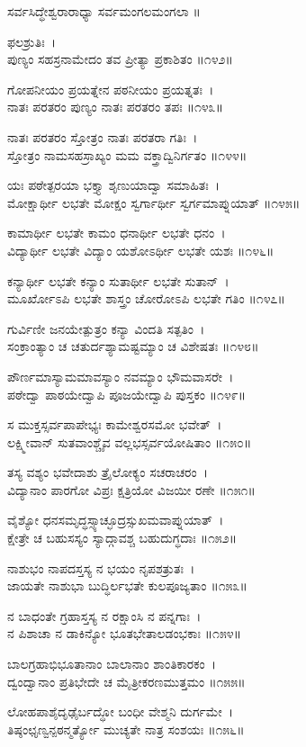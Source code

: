 ಸರ್ವಸಿದ್ಧೇಶ್ವರಾರಾಧ್ಯಾ ಸರ್ವಮಂಗಲಮಂಗಲಾ ॥

ಫಲಶ್ರುತಿಃ~।\\
ಪುಣ್ಯಂ ಸಹಸ್ರನಾಮೇದಂ ತವ ಪ್ರೀತ್ಯಾ ಪ್ರಕಾಶಿತಂ ॥೧೪೨॥

ಗೋಪನೀಯಂ ಪ್ರಯತ್ನೇನ ಪಠನೀಯಂ ಪ್ರಯತ್ನತಃ~।\\
ನಾತಃ ಪರತರಂ ಪುಣ್ಯಂ ನಾತಃ ಪರತರಂ ತಪಃ ॥೧೪೩॥

ನಾತಃ ಪರತರಂ ಸ್ತೋತ್ರಂ ನಾತಃ ಪರತರಾ ಗತಿಃ~।\\
ಸ್ತೋತ್ರಂ ನಾಮಸಹಸ್ರಾಖ್ಯಂ ಮಮ ವಕ್ತ್ರಾದ್ವಿನಿರ್ಗತಂ ॥೧೪೪॥

ಯಃ ಪಠೇತ್ಪರಯಾ ಭಕ್ತ್ಯಾ ಶೃಣುಯಾದ್ವಾ ಸಮಾಹಿತಃ~।\\
ಮೋಕ್ಷಾರ್ಥೀ ಲಭತೇ ಮೋಕ್ಷಂ ಸ್ವರ್ಗಾರ್ಥೀ ಸ್ವರ್ಗಮಾಪ್ನುಯಾತ್ ॥೧೪೫॥

ಕಾಮಾರ್ಥೀ ಲಭತೇ ಕಾಮಂ ಧನಾರ್ಥೀ ಲಭತೇ ಧನಂ~।\\
ವಿದ್ಯಾರ್ಥೀ ಲಭತೇ ವಿದ್ಯಾಂ ಯಶೋಽರ್ಥೀ ಲಭತೇ ಯಶಃ ॥೧೪೬॥

ಕನ್ಯಾರ್ಥೀ ಲಭತೇ ಕನ್ಯಾಂ ಸುತಾರ್ಥೀ ಲಭತೇ ಸುತಾನ್~।\\
ಮೂರ್ಖೋಽಪಿ ಲಭತೇ ಶಾಸ್ತ್ರಂ ಚೋರೋಽಪಿ ಲಭತೇ ಗತಿಂ ॥೧೪೭॥

ಗುರ್ವಿಣೀ ಜನಯೇತ್ಪುತ್ರಂ ಕನ್ಯಾ ವಿಂದತಿ ಸತ್ಪತಿಂ~।\\
ಸಂಕ್ರಾಂತ್ಯಾಂ ಚ ಚತುರ್ದಶ್ಯಾಮಷ್ಟಮ್ಯಾಂ ಚ ವಿಶೇಷತಃ ॥೧೪೮॥

ಪೌರ್ಣಮಾಸ್ಯಾಮಮಾವಸ್ಯಾಂ ನವಮ್ಯಾಂ ಭೌಮವಾಸರೇ~।\\
ಪಠೇದ್ವಾ ಪಾಠಯೇದ್ವಾಪಿ ಪೂಜಯೇದ್ವಾಪಿ ಪುಸ್ತಕಂ ॥೧೪೯॥

ಸ ಮುಕ್ತಸ್ಸರ್ವಪಾಪೇಭ್ಯಃ ಕಾಮೇಶ್ವರಸಮೋ ಭವೇತ್~।\\
ಲಕ್ಷ್ಮೀವಾನ್ ಸುತವಾಂಶ್ಚೈವ ವಲ್ಲಭಸ್ಸರ್ವಯೋಷಿತಾಂ ॥೧೫೦॥

ತಸ್ಯ ವಶ್ಯಂ ಭವೇದಾಶು ತ್ರೈಲೋಕ್ಯಂ ಸಚರಾಚರಂ~।\\
ವಿದ್ಯಾನಾಂ ಪಾರಗೋ ವಿಪ್ರಃ ಕ್ಷತ್ರಿಯೋ ವಿಜಯೀ ರಣೇ ॥೧೫೧॥

ವೈಶ್ಯೋ ಧನಸಮೃದ್ಧಸ್ಸ್ಯಾಚ್ಛೂದ್ರಸ್ಸುಖಮವಾಪ್ನುಯಾತ್~।\\
ಕ್ಷೇತ್ರೇ ಚ ಬಹುಸಸ್ಯಂ ಸ್ಯಾದ್ಗಾವಶ್ಚ ಬಹುದುಗ್ಧದಾಃ ॥೧೫೨॥

ನಾಶುಭಂ ನಾಪದಸ್ತಸ್ಯ ನ ಭಯಂ ನೃಪಶತ್ರುತಃ~।\\
ಜಾಯತೇ ನಾಶುಭಾ ಬುದ್ಧಿರ್ಲಭತೇ ಕುಲಪೂಜ್ಯತಾಂ ॥೧೫೩॥

ನ ಬಾಧಂತೇ ಗ್ರಹಾಸ್ತಸ್ಯ ನ ರಕ್ಷಾಂಸಿ ನ ಪನ್ನಗಾಃ~।\\
ನ ಪಿಶಾಚಾ ನ ಡಾಕಿನ್ಯೋ ಭೂತಭೇತಾಲಡಂಭಕಾಃ ॥೧೫೪॥

ಬಾಲಗ್ರಹಾಭಿಭೂತಾನಾಂ ಬಾಲಾನಾಂ ಶಾಂತಿಕಾರಕಂ~।\\
ದ್ವಂದ್ವಾನಾಂ ಪ್ರತಿಭೇದೇ ಚ ಮೈತ್ರೀಕರಣಮುತ್ತಮಂ ॥೧೫೫॥

ಲೋಹಪಾಶೈದೃಢೈರ್ಬದ್ಧೋ ಬಂಧೀ ವೇಶ್ಮನಿ ದುರ್ಗಮೇ~।\\
ತಿಷ್ಠಂಛೃಣ್ವನ್ಪಠನ್ಮರ್ತ್ಯೋ ಮುಚ್ಯತೇ ನಾತ್ರ ಸಂಶಯಃ ॥೧೫೬॥

